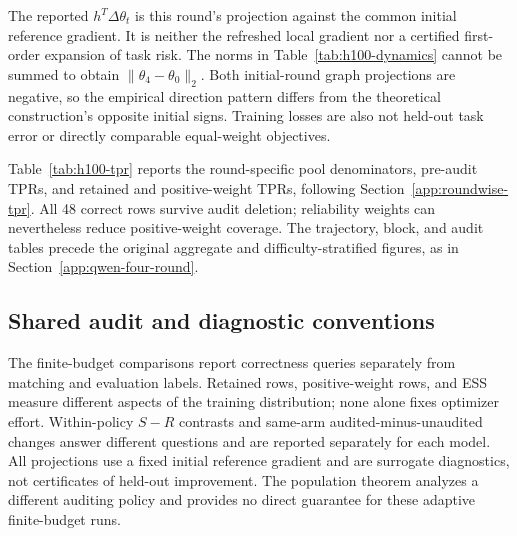 The reported $h^T\Delta\theta_t$ is this round's projection against the
common initial reference gradient. It is neither the refreshed local
gradient nor a certified first-order expansion of task risk. The norms
in Table~\ref{tab:h100-dynamics} cannot be summed to obtain
$\|\theta_4-\theta_0\|_2$. Both initial-round graph projections are
negative, so the empirical direction pattern differs from the theoretical
construction's opposite initial signs. Training losses are also not
held-out task error or directly comparable equal-weight objectives.




Table~\ref{tab:h100-tpr} reports the round-specific pool denominators,
pre-audit TPRs, and retained and positive-weight TPRs, following
Section~\ref{app:roundwise-tpr}. All 48 correct rows survive audit deletion;
reliability weights can nevertheless reduce positive-weight coverage.
The trajectory, block, and audit tables precede the original aggregate and
difficulty-stratified figures, as in Section~\ref{app:qwen-four-round}.



\subsection{Shared audit and diagnostic conventions}
The finite-budget comparisons report correctness queries separately from
matching and evaluation labels. Retained rows, positive-weight rows, and
ESS measure different aspects of the training distribution; none alone
fixes optimizer effort. Within-policy $S-R$ contrasts and same-arm
audited-minus-unaudited changes answer different questions and are reported
separately for each model. All projections use a fixed initial reference
gradient and are surrogate diagnostics, not certificates of held-out
improvement. The population theorem analyzes a different auditing policy
and provides no direct guarantee for these adaptive finite-budget runs.


